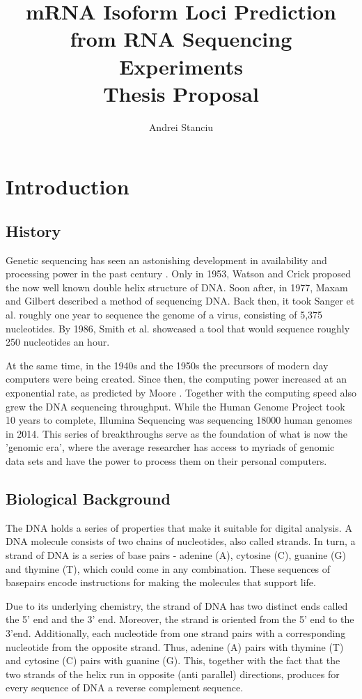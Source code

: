 \documentclass[12pt]{article}
\title{%
    mRNA Isoform Loci Prediction from RNA Sequencing Experiments \\
    \large Thesis Proposal}
\author{Andrei Stanciu}
\begin{document}
\maketitle

\section{Introduction}


\subsection{History}
Genetic sequencing has seen an astonishing development in availability and processing power in the past century
\cite{Hood2003}. Only in 1953, Watson and Crick \cite{WATSON1953} proposed the now well known double helix structure of DNA. Soon after, in 1977, Maxam and Gilbert \cite{Maxam1977} described a method of sequencing DNA. Back then, it took Sanger et al. \cite{Sanger1977} roughly one year to sequence the genome of a virus, consisting of 5,375 nucleotides. By 1986, Smith et al. \cite{Smith1986} showcased a tool that would sequence roughly 250 nucleotides an hour. 

At the same time, in the 1940s and the 1950s the precursors of modern day computers were being created. Since then, the computing power increased at an exponential rate, as predicted by Moore \cite{Moore2006}. Together with the computing speed also grew the DNA sequencing throughput. While the Human Genome Project took 10 years to complete, Illumina Sequencing \cite{illuminaSeq} was sequencing 18000 human genomes in 2014. This series of breakthroughs serve as the foundation of what is now the 'genomic era', where the average researcher has access to myriads of genomic data sets and have the power to process them on their personal computers.   

\subsection{Biological Background}
The DNA holds a series of properties that make it suitable for digital analysis. A DNA molecule consists of two chains of nucleotides, also called strands. In turn, a strand of DNA is a series of  base pairs - adenine (A), cytosine (C), guanine (G) and thymine (T), which could come in any combination. These sequences of basepairs encode instructions for making the molecules that support life. 


Due to its underlying chemistry, the strand of DNA has two distinct ends called the 5' end and the 3' end. Moreover, the strand is oriented from the 5' end to the 3'end. Additionally, each nucleotide from one strand pairs with a corresponding nucleotide from the opposite strand. Thus, adenine (A) pairs with thymine (T) and cytosine (C) pairs with guanine (G). This, together with the fact that the two strands of the helix run in opposite (anti parallel) directions, produces for every sequence of DNA a reverse complement sequence. 
\end{document}
